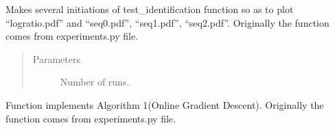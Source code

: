 \documentclass[letterpaper,10pt,english]{sphinxmanual}
\begin{document}

\begin{fulllineitems}
\label{\detokenize{LDS:LDS.OnlineLDS_library.testSeqD0}}
\sphinxAtStartPar
Makes several initiations of test\_identification function so as to plot “logratio.pdf” and
“seq0.pdf”, “seq1.pdf”, “seq2.pdf”. Originally the function comes from experiments.py file.
\begin{quote}\begin{description}
\item[{Parameters}] \leavevmode
\sphinxAtStartPar
{} \textendash{} Number of runs.

\end{description}\end{quote}

\end{fulllineitems}


\begin{fulllineitems}
\label{\detokenize{LDS:LDS.OnlineLDS_library.test_AR}}
\sphinxAtStartPar
Function implements Algorithm 1(On\sphinxhyphen{}line Gradient Descent).
Originally the function comes from experiments.py file.

\end{fulllineitems}

\end{document}
